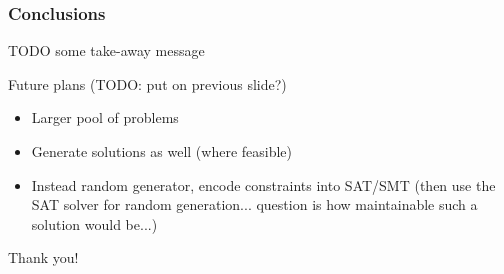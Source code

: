 \documentclass[xcolor={table}]{beamer}
\begin{document}


\begin{frame}
\frametitle{Conclusions}
TODO some take-away message


\bigskip
\pause


Future plans (TODO: put on previous slide?)
\begin{itemize}
    \item Larger pool of problems
    \item Generate solutions as well (where feasible)
    \item Instead random generator, encode constraints into SAT/SMT
            (then use the SAT solver for random generation... question is how maintainable such a solution would be...)
\end{itemize}

\bigskip
\pause

\begin{center}
    Thank you!
\end{center}
\end{frame}

\end{document}
